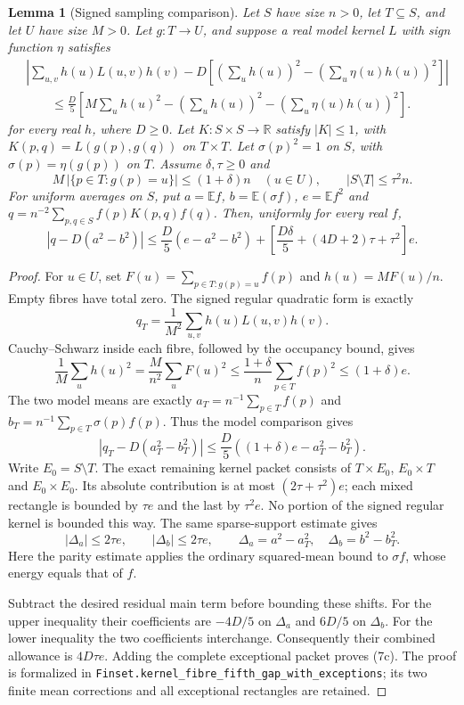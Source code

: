 \documentclass[11pt]{article}
\newtheorem{lemma}{Lemma}
\newcommand{\E}{\mathbb E}
\begin{document}
\begin{lemma}[Signed sampling comparison]\label{lem:fibre}
Let \(S\) have size \(n>0\), let \(T\subseteq S\), and let \(U\) have
size \(M>0\). Let \(g:T\to U\), and suppose a real model kernel \(L\)
with sign function \(\eta\) satisfies
\[
 \begin{aligned}
 &\left|\sum_{u,v}h(u)L(u,v)h(v)
       -D\left[(\sum_u h(u))^2-(\sum_u\eta(u)h(u))^2\right]\right|\\
 &\qquad\le\frac D5\left[M\sum_u h(u)^2
       -(\sum_u h(u))^2-(\sum_u\eta(u)h(u))^2\right].
 \end{aligned}
\]
for every real \(h\), where \(D\ge0\).
Let \(K:S\times S\to\mathbb R\) satisfy \(|K|\le1\), with
\(K(p,q)=L(g(p),g(q))\) on \(T\times T\).
Let \(\sigma(p)^2=1\) on \(S\), with
\(\sigma(p)=\eta(g(p))\) on \(T\).
Assume \(\delta,\tau\ge0\) and
\[
 M\,|\{p\in T:g(p)=u\}|\le(1+\delta)n\quad(u\in U),
 \qquad |S\setminus T|\le\tau^2n.
\]
For uniform averages on \(S\), put \(a=\E f\), \(b=\E(\sigma f)\),
\(e=\E f^2\) and
\(q=n^{-2}\sum_{p,q\in S}f(p)K(p,q)f(q)\). Then, uniformly for every real \(f\),
\[
 |q-D(a^2-b^2)|
 \le \frac D5(e-a^2-b^2)
       +\left[\frac{D\delta}{5}+(4D+2)\tau+\tau^2\right]e.       \tag{7c}
\]
\end{lemma}

\begin{proof}
For \(u\in U\), set \(F(u)=\sum_{p\in T:g(p)=u}f(p)\) and
\(h(u)=MF(u)/n\). Empty fibres have total zero.
The signed regular quadratic form is exactly
\[
 q_T=\frac1{M^2}\sum_{u,v}h(u)L(u,v)h(v).
\]
Cauchy--Schwarz inside each fibre, followed by the occupancy bound, gives
\[
 \frac1M\sum_u h(u)^2
 =\frac M{n^2}\sum_u F(u)^2
 \le\frac{1+\delta}{n}\sum_{p\in T}f(p)^2\le(1+\delta)e.
\]
The two model means are exactly
\(a_T=n^{-1}\sum_{p\in T}f(p)\) and
\(b_T=n^{-1}\sum_{p\in T}\sigma(p)f(p)\).
Thus the model comparison gives
\[
 |q_T-D(a_T^2-b_T^2)|
       \le\frac D5((1+\delta)e-a_T^2-b_T^2).
\]
Write \(E_0=S\setminus T\). The exact remaining kernel packet consists of
\(T\times E_0\), \(E_0\times T\) and \(E_0\times E_0\).
Its absolute contribution is at most \((2\tau+\tau^2)e\);
each mixed rectangle is bounded by \(\tau e\) and the last by \(\tau^2e\).
No portion of the signed regular kernel is bounded this way.
The same sparse-support estimate gives
\[
 |\Delta_a|\le2\tau e,\qquad|\Delta_b|\le2\tau e,\qquad
 \Delta_a=a^2-a_T^2,\quad\Delta_b=b^2-b_T^2.
\]
Here the parity estimate applies the ordinary squared-mean bound to
\(\sigma f\), whose energy equals that of \(f\).

Subtract the desired residual main term before bounding these shifts.
For the upper inequality their coefficients are
\(-4D/5\) on \(\Delta_a\) and \(6D/5\) on \(\Delta_b\).
For the lower inequality the two coefficients interchange.
Consequently their combined allowance is \(4D\tau e\).
Adding the complete exceptional packet proves (7c).
The proof is formalized in
\texttt{Finset.kernel\_fibre\_fifth\_gap\_with\_exceptions};
its two finite mean corrections and all exceptional rectangles are retained.
\end{proof}
\end{document}
